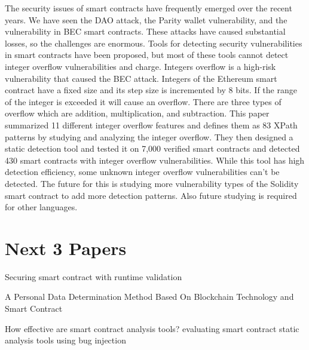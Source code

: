 \documentclass{article}
\begin{document}
The security issues of smart contracts have frequently emerged over the recent years. We have seen the DAO attack, the Parity wallet vulnerability, and the vulnerability in BEC smart contracts. These attacks have caused substantial losses, so the challenges are enormous. Tools for detecting security vulnerabilities in smart contracts have been proposed, but most of these tools cannot detect integer overflow vulnerabilities and charge. Integers overflow is a high-risk vulnerability that caused the BEC attack. Integers of the Ethereum smart contract have a fixed size and its step size is incremented by 8 bits. If the range of the integer is exceeded it will cause an overflow. There are three types of overflow which are addition, multiplication, and subtraction. This paper summarized 11 different integer overflow features and defines them as 83 XPath patterns by studying and analyzing the integer overflow. They then designed a static detection tool and tested it on 7,000 verified smart contracts and detected 430 smart contracts with integer overflow vulnerabilities. While this tool has high detection efficiency, some unknown integer overflow vulnerabilities can't be detected. The future for this is studying more vulnerability types of the Solidity smart contract to add more detection patterns. Also future studying is required for other languages. 

\section{Next 3 Papers}
\item Securing smart contract with runtime validation
\item A Personal Data Determination Method Based On Blockchain Technology and Smart Contract
\item How effective are smart contract analysis tools? evaluating smart contract static analysis tools using bug injection


\printbibliography
\end{document}
